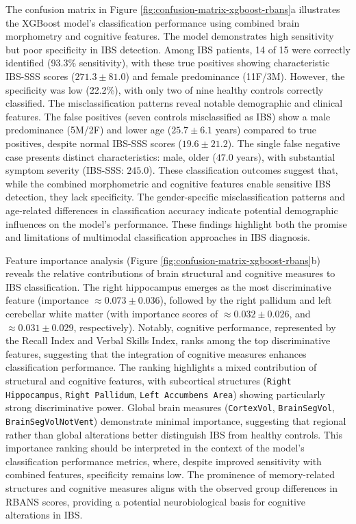 \documentclass[diagnostics,article,accept,pdftex,moreauthors]{Definitions/mdpi}
\begin{document}
The confusion matrix in Figure \ref{fig:confusion-matrix-xgboost-rbans}a illustrates the XGBoost model's classification performance using combined brain morphometry and cognitive features. The model demonstrates high sensitivity but poor specificity in IBS detection. Among IBS patients, 14 of 15 were correctly identified (93.3\% sensitivity), with these true positives showing characteristic IBS-SSS scores ($271.3 \pm 81.0$) and female predominance (11F/3M). However, the specificity was low (22.2\%), with only two of nine healthy controls correctly classified. The misclassification patterns reveal notable demographic and clinical features. The false positives (seven controls misclassified as IBS) show a male predominance (5M/2F) and lower age ($25.7 \pm 6.1$ years) compared to true positives, despite normal IBS-SSS scores (\mbox{$19.6 \pm 21.2$}). The single false negative case presents distinct characteristics: male, older ($47.0$ years), with substantial symptom severity (IBS-SSS: $245.0$). These classification outcomes suggest that, while the combined morphometric and cognitive features enable sensitive IBS detection, they lack specificity. The gender-specific misclassification patterns and age-related differences in classification accuracy indicate potential demographic influences on the model's performance. These findings highlight both the promise and limitations of multimodal classification approaches in IBS diagnosis.


Feature importance analysis (Figure \ref{fig:confusion-matrix-xgboost-rbans}b) reveals the relative contributions of brain structural and cognitive measures to IBS classification. The right hippocampus emerges as the most discriminative feature (importance $\approx 0.073 \pm 0.036$), followed by the right pallidum and left cerebellar white matter (with importance scores of $\approx 0.032 \pm 0.026$, and $\approx 0.031 \pm 0.029$, respectively). Notably, cognitive performance, represented by the Recall Index and Verbal Skills Index, ranks among the top discriminative features, suggesting that the integration of cognitive measures enhances classification performance. The ranking highlights a mixed contribution of structural and cognitive features, with subcortical structures (\texttt{Right Hippocampus}, \texttt{Right Pallidum}, \texttt{Left Accumbens Area}) showing particularly strong discriminative power. Global brain measures (\texttt{CortexVol}, \texttt{BrainSegVol}, \texttt{BrainSegVolNotVent}) demonstrate minimal importance, suggesting that regional rather than global alterations better distinguish IBS from healthy controls. This importance ranking should be interpreted in the context of the model's classification performance metrics, where, despite improved sensitivity with combined features, specificity remains low. The prominence of memory-related structures and cognitive measures aligns with the observed group differences in RBANS scores, providing a potential neurobiological basis for cognitive alterations in IBS.
\end{document}
